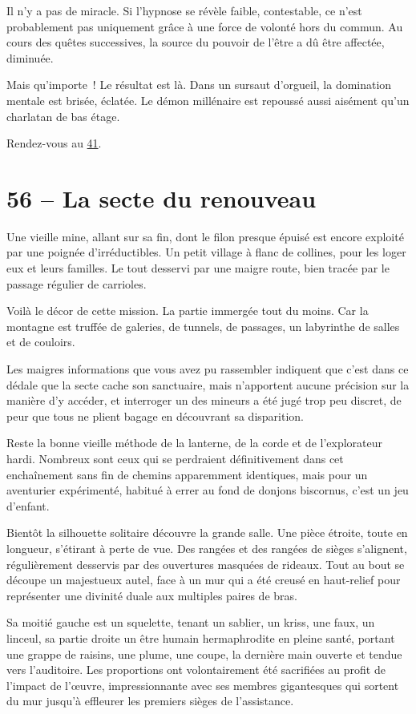 \documentclass{report}
\newcommand{\gsection}[1]{
    \section{#1}
    \label{section-#1}
}
\newcommand{\glink}[1]{\hyperref[section-#1]{#1}}
\begin{document}
Il n'y a pas de miracle. Si l'hypnose se révèle faible, contestable, ce n'est probablement pas uniquement grâce à une force de volonté hors du commun. Au cours des quêtes successives, la source du pouvoir de l'être a dû être affectée, diminuée.

Mais qu'importe ! Le résultat est là. Dans un sursaut d'orgueil, la domination mentale est brisée, éclatée. Le démon millénaire est repoussé aussi aisément qu'un charlatan de bas étage.

Rendez-vous au \glink{41}.

\gsection{56 – La secte du renouveau}

Une vieille mine, allant sur sa fin, dont le filon presque épuisé est encore exploité par une poignée d'irréductibles. Un petit village à flanc de collines, pour les loger eux et leurs familles. Le tout desservi par une maigre route, bien tracée par le passage régulier de carrioles.

Voilà le décor de cette mission. La partie immergée tout du moins. Car la montagne est truffée de galeries, de tunnels, de passages, un labyrinthe de salles et de couloirs.

Les maigres informations que vous avez pu rassembler indiquent que c'est dans ce dédale que la secte cache son sanctuaire, mais n'apportent aucune précision sur la manière d'y accéder, et interroger un des mineurs a été jugé trop peu discret, de peur que tous ne plient bagage en découvrant sa disparition.

Reste la bonne vieille méthode de la lanterne, de la corde et de l'explorateur hardi. Nombreux sont ceux qui se perdraient définitivement dans cet enchaînement sans fin de chemins apparemment identiques, mais pour un aventurier expérimenté, habitué à errer au fond de donjons biscornus, c'est un jeu d'enfant.

Bientôt la silhouette solitaire découvre la grande salle. Une pièce étroite, toute en longueur, s'étirant à perte de vue. Des rangées et des rangées de sièges s'alignent, régulièrement desservis par des ouvertures masquées de rideaux. Tout au bout se découpe un majestueux autel, face à un mur qui a été creusé en haut-relief pour représenter une divinité duale aux multiples paires de bras.

Sa moitié gauche est un squelette, tenant un sablier, un kriss, une faux, un linceul, sa partie droite un être humain hermaphrodite en pleine santé, portant une grappe de raisins, une plume, une coupe, la dernière main ouverte et tendue vers l'auditoire. Les proportions ont volontairement été sacrifiées au profit de l'impact de l’œuvre, impressionnante avec ses membres gigantesques qui sortent du mur jusqu'à effleurer les premiers sièges de l'assistance.
\end{document}
